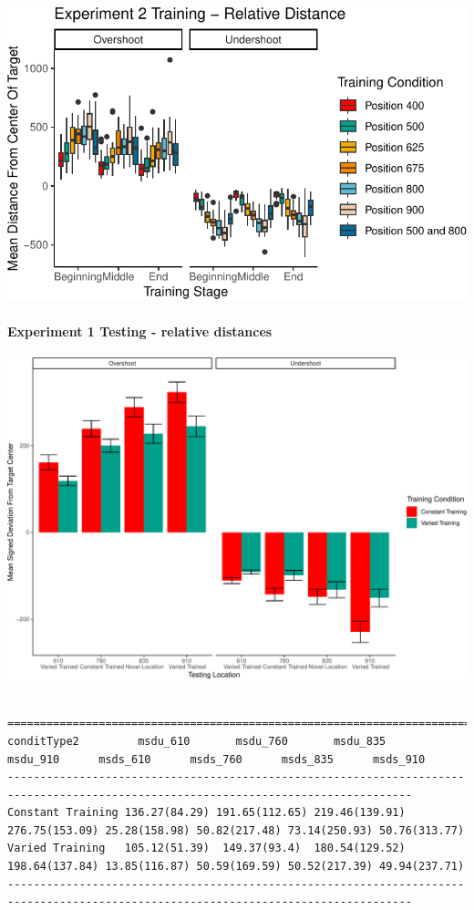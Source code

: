 \documentclass[
  12pt,
  letterpaper,
]{article}
\begin{document}
\includegraphics{full_files/figure-pdf/unnamed-chunk-64-2.pdf}

\paragraph{Experiment 1 Testing - relative
distances}\label{experiment-1-testing---relative-distances}

\includegraphics{full_files/figure-pdf/unnamed-chunk-65-1.pdf}

\begin{verbatim}

====================================================================================================================================
conditType2         msdu_610       msdu_760       msdu_835       msdu_910      msds_610      msds_760      msds_835      msds_910   
------------------------------------------------------------------------------------------------------------------------------------
Constant Training 136.27(84.29) 191.65(112.65) 219.46(139.91) 276.75(153.09) 25.28(158.98) 50.82(217.48) 73.14(250.93) 50.76(313.77)
Varied Training   105.12(51.39)  149.37(93.4)  180.54(129.52) 198.64(137.84) 13.85(116.87) 50.59(169.59) 50.52(217.39) 49.94(237.71)
------------------------------------------------------------------------------------------------------------------------------------
\end{verbatim}
\end{document}
